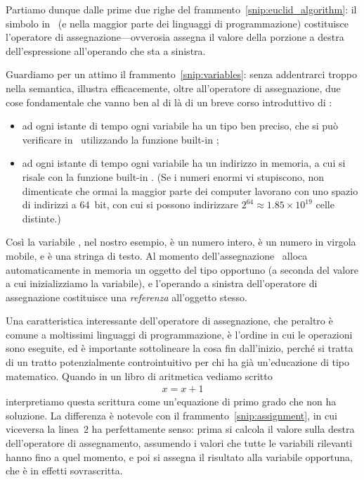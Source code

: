 Partiamo dunque dalle prime due righe del frammento~\ref{snip:euclid_algorithm}:
il simbolo \cchar{=} in \python\ (e nella maggior parte dei linguaggi di programmazione)
costituisce l'operatore di assegnazione---ovverosia assegna il valore della porzione a
destra dell'espressione all'operando che sta a sinistra.


Guardiamo per un attimo il frammento~\ref{snip:variables}: senza addentrarci troppo
nella semantica, illustra efficacemente, oltre all'operatore di assegnazione, due
cose fondamentale che vanno ben al di l\`a di un breve corso introduttivo di \python:
\begin{itemize}
  \item ad ogni istante di tempo ogni variabile ha un tipo ben preciso, che si pu\`o
    verificare in \python\ utilizzando la funzione built-in ;
  \item ad ogni istante di tempo ogni variabile ha un indirizzo in memoria, a cui
    si risale con la funzione built-in . (Se i numeri enormi vi stupiscono,
    non dimenticate che ormai la maggior parte dei computer lavorano con uno spazio
    di indirizzi a $64$~bit, con cui si possono indirizzare $2^{64} \approx 1.85 \times 10^{19}$
    celle distinte.)
\end{itemize}
Cos\`i la variabile , nel nostro esempio, \`e un numero intero, 
\`e un numero in virgola mobile, e  \`e una stringa di testo. Al momento
dell'assegnazione \python\ alloca automaticamente in memoria un oggetto del tipo
opportuno (a seconda del valore a cui inizializziamo la variabile), e l'operando
a sinistra dell'operatore di assegnazione costituisce una \emph{referenza} all'oggetto
stesso.

Una caratteristica interessante dell'operatore di assegnazione, che peraltro \`e
comune a moltissimi linguaggi di programmazione, \`e l'ordine in cui le operazioni
sono eseguite, ed \`e importante sottolineare la cosa fin dall'inizio, perch\'e
si tratta di un tratto potenzialmente controintuitivo per chi ha gi\`a un'educazione
di tipo matematico. Quando in un libro di aritmetica vediamo scritto
\begin{align*}
  x = x + 1
\end{align*}
interpretiamo questa scrittura come un'equazione di primo grado che non ha soluzione.
La differenza \`e notevole con il frammento~\ref{snip:assignment}, in cui viceversa
la linea~$2$ ha perfettamente senso: prima si calcola il valore sulla destra dell'operatore
di assegnamento, assumendo i valori che tutte le variabili rilevanti hanno fino a
quel momento, e poi si assegna il risultato alla variabile opportuna, che \`e in
effetti sovrascritta.


